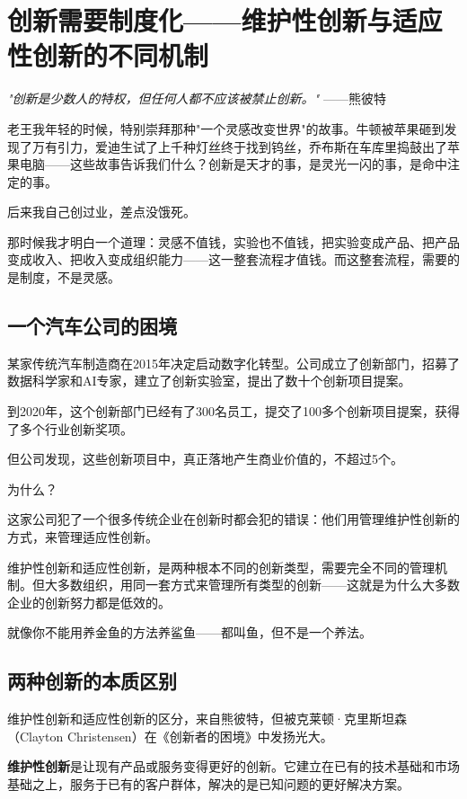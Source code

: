 \chapter{创新需要制度化——维护性创新与适应性创新的不同机制}


\textit{"创新是少数人的特权，但任何人都不应该被禁止创新。"}
——熊彼特


老王我年轻的时候，特别崇拜那种"一个灵感改变世界"的故事。牛顿被苹果砸到发现了万有引力，爱迪生试了上千种灯丝终于找到钨丝，乔布斯在车库里捣鼓出了苹果电脑——这些故事告诉我们什么？创新是天才的事，是灵光一闪的事，是命中注定的事。

后来我自己创过业，差点没饿死。

那时候我才明白一个道理：灵感不值钱，实验也不值钱，把实验变成产品、把产品变成收入、把收入变成组织能力——这一整套流程才值钱。而这整套流程，需要的是制度，不是灵感。

\section{一个汽车公司的困境}


某家传统汽车制造商在2015年决定启动数字化转型。公司成立了创新部门，招募了数据科学家和AI专家，建立了创新实验室，提出了数十个创新项目提案。

到2020年，这个创新部门已经有了300名员工，提交了100多个创新项目提案，获得了多个行业创新奖项。

但公司发现，这些创新项目中，真正落地产生商业价值的，不超过5个。

为什么？

这家公司犯了一个很多传统企业在创新时都会犯的错误：他们用管理维护性创新的方式，来管理适应性创新。

维护性创新和适应性创新，是两种根本不同的创新类型，需要完全不同的管理机制。但大多数组织，用同一套方式来管理所有类型的创新——这就是为什么大多数企业的创新努力都是低效的。

就像你不能用养金鱼的方法养鲨鱼——都叫鱼，但不是一个养法。

\section{两种创新的本质区别}


维护性创新和适应性创新的区分，来自熊彼特，但被克莱顿·克里斯坦森（Clayton Christensen）在《创新者的困境》中发扬光大。

\textbf{维护性创新}是让现有产品或服务变得更好的创新。它建立在已有的技术基础和市场基础之上，服务于已有的客户群体，解决的是已知问题的更好解决方案。

